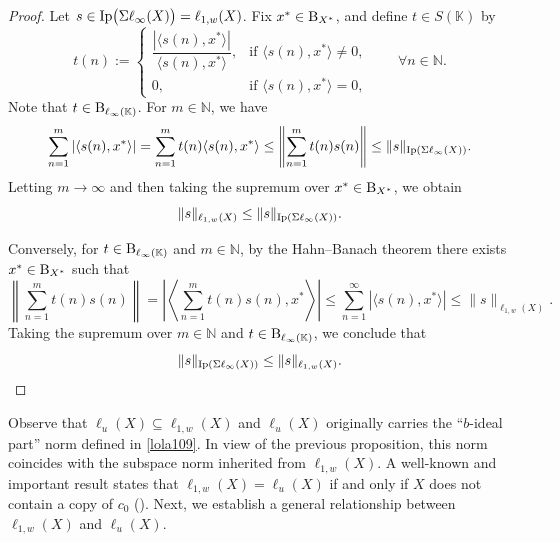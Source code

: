 \documentclass[14pt, a4paper]{article}  %
\providecommand{\pare}[1]{\left( #1\right) }
\providecommand{\norm}[1]{\left\lVert#1\right\rVert}
\providecommand{\abs}[1]{\left\lvert#1\right\rvert}
\newcommand{\K}{\mathbb{K}}
\newcommand{\N}{\mathbb{N}}
\newcommand{\B}{\textup{B}}
\newcommand{\la}{\left\langle}
\newcommand{\ra}{\right\rangle}
\providecommand{\ral}[1]{\la#1\ra}
\begin{document}
\begin{proof}
	Let $s \in \textup{Ip}\big(\Sigma \ell_{\infty}(X)\big) = \ell_{1,w}(X)$. Fix $x^{*} \in \B_{X^{*}}$, and define $t \in S(\K)$ by
	\begin{equation}
	t(n) :=
	\begin{cases}
		\dfrac{|\langle s(n), x^{*} \rangle|}{\langle s(n), x^{*} \rangle},
		& \text{if } \langle s(n), x^{*} \rangle \neq 0, \\[.2cm]
		0, & \text{if } \langle s(n), x^{*} \rangle = 0,
	\end{cases}
	\qquad \forall n \in \N. 
\end{equation}
	Note that $t \in \B_{\ell_{\infty}(\K)}$. For $m \in \N$, we have
	\begin{equation}
		\sum_{n=1}^{m} |\langle s(n), x^{*} \rangle|
	 =
		\sum_{n=1}^{m} t(n)\langle s(n), x^{*} \rangle \le
		\norm{\sum_{n=1}^{m} t(n)s(n) }
		\le
		\|s\|_{\textup{Ip}(\Sigma \ell_{\infty}(X))}.
	\end{equation}
	Letting $m \to \infty$ and then taking the supremum over $x^{*} \in \B_{X^{*}}$, we obtain
\begin{equation}
	\|s\|_{\ell_{1,w}(X)}
	\le
	\|s\|_{\textup{Ip}(\Sigma \ell_{\infty}(X))}.
\end{equation}
	
	Conversely, for $t \in \B_{\ell_{\infty}(\K)}$ and $m \in \N$, by the Hahn--Banach theorem there exists $x^{*} \in \B_{X^{*}}$ such that
	\begin{equation}
		\norm{ \sum_{n=1}^{m} t(n)s(n)}
		 =
		  \abs{ \ral{  \sum_{n=1}^{m} t(n)s(n), x^{*} } } \le
		\sum_{n=1}^{\infty} |\langle s(n), x^{*} \rangle|
		\le
		\|s\|_{\ell_{1,w}(X)}.
	\end{equation}
	Taking the supremum over $m \in \N$ and $t \in \B_{\ell_{\infty}(\K)}$, we conclude that
	\[
	\|s\|_{\textup{Ip}(\Sigma \ell_{\infty}(X))}
	\le
	\|s\|_{\ell_{1,w}(X)}.\qedhere
	\]
\end{proof}

Observe that $\ell_{u}(X)\subseteq \ell_{1,w}(X)$ and $\ell_{u}\pare{X}$ originally carries the ``$b$-ideal  part'' norm defined in \eqref{lola109}. In view of the previous proposition, this norm coincides with the subspace norm inherited from $\ell_{1,w}(X)$.  A well-known and important result states that $\ell_{1,w} (X) = \ell_u (X)$ if  and only if $X$ does not contain a copy of $c_0$  (\cite[Thm. 5]{BP}).
Next, we establish a general relationship between $\ell_{1,w} (X)$ and $\ell_u (X)$.
\end{document}
